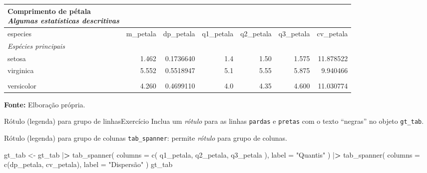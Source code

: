 \documentclass[
  10pt,
  ignorenonframetext,
]{beamer}
\newenvironment{Shaded}{}{}
\newcommand{\DataTypeTok}[1]{#1}
\newcommand{\ErrorTok}[1]{\textcolor[rgb]{1.00,0.00,0.00}{\textbf{#1}}}
\newcommand{\KeywordTok}[1]{\textcolor[rgb]{0.00,0.00,1.00}{#1}}
\newcommand{\NormalTok}[1]{#1}
\newcommand{\OperatorTok}[1]{#1}
\newcommand{\StringTok}[1]{\textcolor[rgb]{0.00,0.50,0.50}{#1}}
\begin{document}
\begin{frame}
\footnotesize

\setlength{\LTpost}{0mm}
\begin{longtable}{lrrrrrr}
\caption*{
{\large \textbf{Comprimento de pétala}} \\ 
{\small \emph{Algumas estatísticas descritivas}}
} \\ 
\toprule
especies & m\_petala & dp\_petala & q1\_petala & q2\_petala & q3\_petala & cv\_petala \\ 
\midrule
\multicolumn{7}{l}{\emph{Espécies principais}} \\ 
\midrule
setosa & 1.462 & 0.1736640 & 1.4 & 1.50 & 1.575 & 11.878522 \\ 
virginica & 5.552 & 0.5518947 & 5.1 & 5.55 & 5.875 & 9.940466 \\ 
\midrule
\multicolumn{7}{l}{\vspace*{-5mm}} \\ 
versicolor & 4.260 & 0.4699110 & 4.0 & 4.35 & 4.600 & 11.030774 \\ 
\bottomrule
\end{longtable}
\begin{minipage}{\linewidth}
\textbf{Fonte:} Elboração própria.\\
\end{minipage}

\normalsize
\end{frame}

\begin{frame}[fragile]{Rótulo (legenda) para grupo de
linhas\newline Exercício}
\protect\hypertarget{ruxf3tulo-legenda-para-grupo-de-linhasexercuxedcio}{}
Inclua um \emph{rótulo} para as linhas \texttt{pardas} e \texttt{pretas}
com o texto ``negras'' no objeto \texttt{gt\_tab}.
\end{frame}

\begin{frame}[fragile]{Rótulo (legenda) para grupo de colunas}
\protect\hypertarget{ruxf3tulo-legenda-para-grupo-de-colunas}{}
\texttt{tab\_spanner}: permite \emph{rótulo} para grupo de colunas.

\small

\begin{Shaded}
\begin{Highlighting}[]
\NormalTok{gt\_tab \textless{}{-}}\StringTok{ }\NormalTok{gt\_tab }\OperatorTok{|}\ErrorTok{\textgreater{}}
\StringTok{  }\KeywordTok{tab\_spanner}\NormalTok{(}
    \DataTypeTok{columns =} \KeywordTok{c}\NormalTok{(}
\NormalTok{      q1\_petala,}
\NormalTok{      q2\_petala,}
\NormalTok{      q3\_petala}
\NormalTok{    ),}
    \DataTypeTok{label =} \StringTok{"Quantis"}
\NormalTok{  ) }\OperatorTok{|}\ErrorTok{\textgreater{}}
\StringTok{  }\KeywordTok{tab\_spanner}\NormalTok{(}
    \DataTypeTok{columns =} \KeywordTok{c}\NormalTok{(dp\_petala, cv\_petala),}
    \DataTypeTok{label =} \StringTok{"Dispersão"}
\NormalTok{  )}
\NormalTok{gt\_tab}
\end{Highlighting}
\end{Shaded}

\normalsize
\end{frame}
\end{document}
